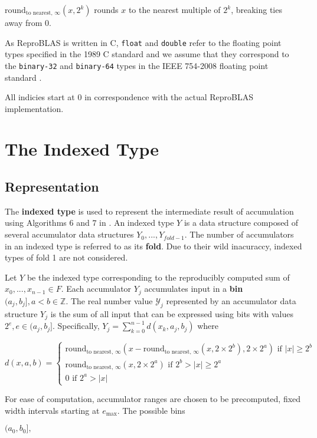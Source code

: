 \documentclass[12pt]{article}
\providecommand{\Z}{\ensuremath{\mathbb{Z}}}
\providecommand{\max}{\ensuremath{\text{max}}}
\providecommand{\roundtonearestinfty}{\ensuremath{\text{round}_\text{to nearest, $\infty$}}}
\theoremstyle{plain}
\begin{document}
  $\roundtonearestinfty(x, 2^k)$ rounds $x$ to the nearest multiple of $2^k$, breaking ties away from 0.

  As ReproBLAS is written in C, \verb|float| and \verb|double| refer to the floating point types specified in the 1989 C standard \cite{c89} and we assume that they correspond to the \verb|binary-32| and \verb|binary-64| types in the IEEE 754-2008 floating point standard \cite{ieee754}.

  All indicies start at $0$ in correspondence with the actual ReproBLAS implementation.

\section{The Indexed Type}
  \subsection{Representation}
    The \textbf{indexed type} is used to represent the intermediate result of accumulation using Algorithms 6 and $7$ in \cite{repsum}.
    An indexed type $Y$ is a data structure composed of several accumulator data structures $Y_0, ..., Y_{fold - 1}$. The number of accumulators in an indexed type is referred to as its \textbf{fold}. Due to their wild inacuraccy, indexed types of fold 1 are not considered.

    Let $Y$ be the indexed type corresponding to the reproducibly computed sum of $x_0, ..., x_{n - 1} \in F$.
    Each accumulator $Y_j$ accumulates input in a \textbf{bin} $(a_j, b_j], a < b \in \Z$. The real number value $\mathcal{Y}_j$ represented by an accumulator data structure $Y_j$ is the sum of all input that can be expressed using bits with values $2^e, e \in (a_j, b_j]$. Specifically, $Y_j = \sum\limits_{k = 0}^{n - 1}d(x_k, a_j, b_j)$ where

    $d(x, a, b) = \begin{cases}\roundtonearestinfty(x - \roundtonearestinfty(x, 2 \times 2^b), 2 \times 2^a) \text{ if } |x| \geq 2^b \\ \roundtonearestinfty(x, 2 \times 2^a) \text{ if } 2^b > |x| \geq 2^a \\ 0 \text{ if } 2^a > |x| \end{cases}$

    For ease of computation, accumulator ranges are chosen to be precomputed, fixed width intervals starting at $e_{\max}$. The possible bins

    $(a_0, b_0],$
\end{document}
